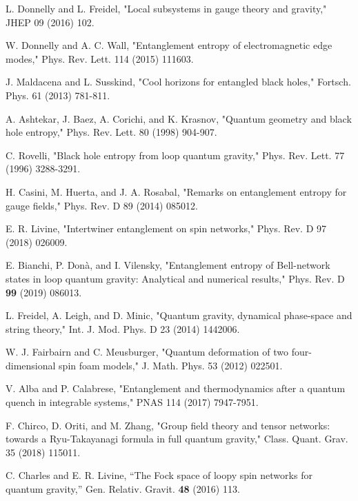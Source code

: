 \documentclass[11pt, a4paper]{article}
\theoremstyle{plain}
\theoremstyle{definition}
\theoremstyle{remark}
\begin{document}

\begin{thebibliography}{99}

   L. Donnelly and L. Freidel, "Local subsystems in gauge theory and gravity," JHEP 09 (2016) 102.

   W. Donnelly and A. C. Wall, "Entanglement entropy of electromagnetic edge modes," Phys. Rev. Lett. 114 (2015) 111603.

   J. Maldacena and L. Susskind, "Cool horizons for entangled black holes," Fortsch. Phys. 61 (2013) 781-811.

   A. Ashtekar, J. Baez, A. Corichi, and K. Krasnov, "Quantum geometry and black hole entropy," Phys. Rev. Lett. 80 (1998) 904-907.

   C. Rovelli, "Black hole entropy from loop quantum gravity," Phys. Rev. Lett. 77 (1996) 3288-3291.

   H. Casini, M. Huerta, and J. A. Rosabal, "Remarks on entanglement entropy for gauge fields," Phys. Rev. D 89 (2014) 085012.

   E. R. Livine, "Intertwiner entanglement on spin networks," Phys. Rev. D 97 (2018) 026009.

   E. Bianchi, P. Donà, and I. Vilensky, "Entanglement entropy of Bell-network states in loop quantum gravity: Analytical and numerical results," Phys. Rev. D \textbf{99} (2019) 086013.

   L. Freidel, A. Leigh, and D. Minic, "Quantum gravity, dynamical phase-space and string theory," Int. J. Mod. Phys. D 23 (2014) 1442006.

   W. J. Fairbairn and C. Meusburger, "Quantum deformation of two four-dimensional spin foam models," J. Math. Phys. 53 (2012) 022501.

   V. Alba and P. Calabrese, "Entanglement and thermodynamics after a quantum quench in integrable systems," PNAS 114 (2017) 7947-7951.

   F. Chirco, D. Oriti, and M. Zhang, "Group field theory and tensor networks: towards a Ryu-Takayanagi formula in full quantum gravity," Class. Quant. Grav. 35 (2018) 115011.

   C. Charles and E. R. Livine, ``The Fock space of loopy spin networks for quantum gravity,'' Gen. Relativ. Gravit. \textbf{48} (2016) 113.


\end{thebibliography}
\end{document}
